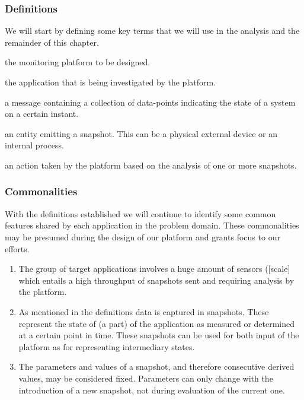 \subsubsection*{Definitions}
We will start by defining some key terms that we will use in the analysis and the remainder of this chapter.
\begin{description}
\nospace
\item[Platform:] the monitoring platform to be designed.
\item[Application:] the application that is being investigated by the platform.
\item[Snapshot:] a message containing a collection of data-points indicating the state of a system on a certain instant.
\item[Source:] an entity emitting a snapshot. This can be a physical external device or an internal process.
\item[Consequence:] an action taken by the platform based on the analysis of one or more snapshots.
\end{description}
\subsubsection*{Commonalities}
With the definitions established we will continue to identify some common features shared by each application in the problem domain. These commonalities may be presumed during the design of our platform and grants focus to our efforts.
\begin{enumerate}[label=C\archid .\arabic*]
\nospace
\item \label{c:scale_sensor} The group of target applications involves a huge amount of sensors ([scale] which entails a high throughput of snapshots sent and requiring analysis by the platform.
\item \label{c:snapshot} As mentioned in the definitions data is captured in snapshots. These represent the state of (a part) of the application as measured or determined at a certain point in time. These snapshots can be used for both input of the platform as for representing intermediary states.
\item \label{c:snapshot_transformation} The parameters and values of a snapshot, and therefore consecutive derived values, may be considered fixed. Parameters can only change with the introduction of a new snapshot, not during evaluation of the current one.
\end{enumerate}
